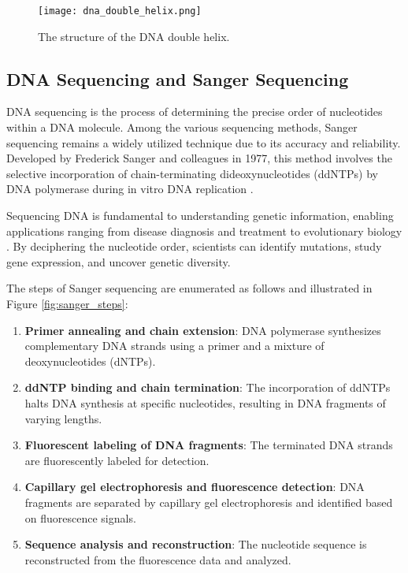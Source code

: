 \begin{figure}[H]
\centering
\texttt{[image: dna\_double\_helix.png]}
\caption{The structure of the DNA double helix.}
\label{fig:dna_double_helix}
\end{figure}

\subsection{DNA Sequencing and Sanger Sequencing}
DNA sequencing is the process of determining the precise order of nucleotides within a DNA molecule. Among the various sequencing methods, Sanger sequencing remains a widely utilized technique due to its accuracy and reliability. Developed by Frederick Sanger and colleagues in 1977, this method involves the selective incorporation of chain-terminating dideoxynucleotides (ddNTPs) by DNA polymerase during in vitro DNA replication \cite{sanger_method_original}.

Sequencing DNA is fundamental to understanding genetic information, enabling applications ranging from disease diagnosis and treatment to evolutionary biology \cite{turn0search0}. By deciphering the nucleotide order, scientists can identify mutations, study gene expression, and uncover genetic diversity.

The steps of Sanger sequencing are enumerated as follows and illustrated in Figure \ref{fig:sanger_steps}: 
\begin{enumerate} 
\item \textbf{Primer annealing and chain extension}: DNA polymerase synthesizes complementary DNA strands using a primer and a mixture of deoxynucleotides (dNTPs). 
\item \textbf{ddNTP binding and chain termination}: The incorporation of ddNTPs halts DNA synthesis at specific nucleotides, resulting in DNA fragments of varying lengths. 
\item \textbf{Fluorescent labeling of DNA fragments}: The terminated DNA strands are fluorescently labeled for detection. 
\item \textbf{Capillary gel electrophoresis and fluorescence detection}: DNA fragments are separated by capillary gel electrophoresis and identified based on fluorescence signals. 
\item \textbf{Sequence analysis and reconstruction}: The nucleotide sequence is reconstructed from the fluorescence data and analyzed. 
\end{enumerate}

